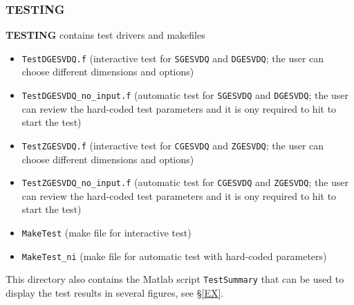 \documentclass[12pt, a4paper, final]{article}
\numberwithin{equation}{section}
\begin{document}
\subsubsection{TESTING}

\textbf{TESTING}  contains test drivers and makefiles

\begin{itemize}
\item \texttt{TestDGESVDQ.f} (interactive test for \texttt{SGESVDQ} and \texttt{DGESVDQ}; the user can choose different dimensions and options)
\item \texttt{TestDGESVDQ\_no\_input.f} (automatic test for \texttt{SGESVDQ} and \texttt{DGESVDQ}; the user can review the hard-coded test parameters and it is ony required to hit  to start the test)
\item \texttt{TestZGESVDQ.f} (interactive test for \texttt{CGESVDQ} and \texttt{ZGESVDQ}; the user can choose different dimensions and options)
\item \texttt{TestZGESVDQ\_no\_input.f} (automatic test for \texttt{CGESVDQ} and \texttt{ZGESVDQ}; the user can review the hard-coded test parameters and it is ony required to hit  to start the test)
\item \texttt{MakeTest} (make file for interactive test)
\item \texttt{MakeTest\_ni} (make file for automatic test with hard-coded parameters)
\end{itemize}

\noindent This directory also contains the Matlab script \texttt{TestSummary} that
can be used to display the test results in several figures, see \S \ref{EX}.
\end{document}

